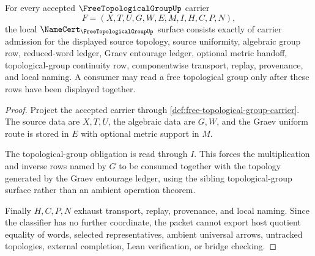 \begin{theorem}
\label{thm:free-topological-group-namecert-obligations}
For every accepted $\FreeTopologicalGroupUp$ carrier
$$
F=(X,T,U,G,W,E,M,I,H,C,P,N),
$$
the local $\NameCert_{\FreeTopologicalGroupUp}$ surface consists exactly of carrier admission for the displayed source topology, source uniformity, algebraic group row, reduced-word ledger, Graev entourage ledger, optional metric handoff, topological-group continuity row, componentwise transport, replay, provenance, and local naming. A consumer may read a free topological group only after these rows have been displayed together.
\end{theorem}
\begin{proof}
Project the accepted carrier through \autoref{def:free-topological-group-carrier}. The source data are $X,T,U$, the algebraic data are $G,W$, and the Graev uniform route is stored in $E$ with optional metric support in $M$.

The topological-group obligation is read through $I$. This forces the multiplication and inverse rows named by $G$ to be consumed together with the topology generated by the Graev entourage ledger, using the sibling topological-group surface rather than an ambient operation theorem.

Finally $H,C,P,N$ exhaust transport, replay, provenance, and local naming. Since the classifier has no further coordinate, the packet cannot export host quotient equality of words, selected representatives, ambient universal arrows, untracked topologies, external completion, Lean verification, or bridge checking.
\end{proof}


